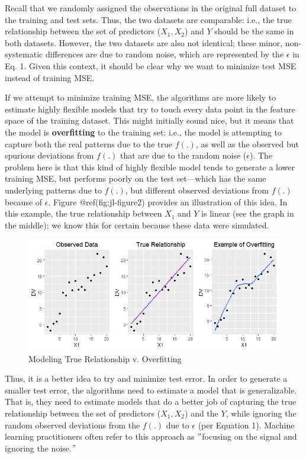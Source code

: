 \documentclass{book}
\begin{document}
Recall that we randomly assigned the observations in the original full dataset
to the training and test sets. Thus, the two datasets are comparable: i.e.,
the true relationship between the set of predictors (\(X_{1}, X_{2}\)) and
\(Y\) should be the same in both datasets. However, the two datasets are also
not identical; these minor, non-systematic differences are due to random
noise, which are represented by the \(\epsilon\) in Eq. 1. Given this context,
it should be clear why we want to minimize test MSE instead of training MSE.

If we attempt to minimize training MSE, the algorithms are more likely to
estimate highly flexible models that try to touch every data point in the
feature space of the training dataset. This might initially sound nice, but it
means that the model is \textbf{overfitting} to the training set: i.e., the
model is attempting to capture both the real patterns due to the true
\({f}(.)\), as well as the observed but spurious deviations from \({f}(.)\)
that are due to the random noise (\(\epsilon\)). The problem here is that this
kind of highly flexible model tends to generate a lower training MSE, but
performs poorly on the test set---which has the same underlying patterns due
to \({f}(.)\), but different observed deviations from \({f}(.)\) because of
\(\epsilon\). Figure @ref(fig:jl-figure2) provides an illustration of this
idea. In this example, the true relationship between \(X_{1}\) and \(Y\) is
linear (see the graph in the middle); we know this for certain because these
data were simulated.

\begin{figure}
\hypertarget{fig:jl-figure2}{%
\centering
\includegraphics{images/ml/jl-figure2.png}
\caption{Modeling True Relationship v. Overfitting}\label{fig:jl-figure2}
}
\end{figure}

Thus, it is a better idea to try and minimize test error. In order to generate
a smaller test error, the algorithms need to estimate a model that is
generalizable. That is, they need to estimate models that do a better job of
capturing the true relationship between the set of predictors
(\(X_{1},X_{2}\)) and the \(Y\), while ignoring the random observed deviations
from the \({f}(.)\) due to \(\epsilon\) (per Equation 1). Machine learning
practitioners often refer to this approach as \("\)focusing on the signal and
ignoring the noise.\("\)
\end{document}
